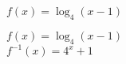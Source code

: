 {$f(x) = \log_{4}(x - 1)$}
{ $f(x) = \log_{4}(x - 1)$\\
$f^{-1}(x) = 4^{x} + 1$\\

\begin{center}
\end{center}}


